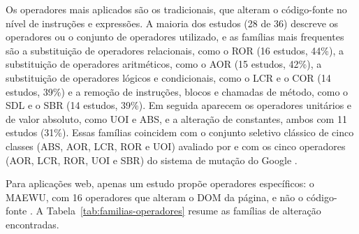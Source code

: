 Os operadores mais aplicados são os tradicionais, que alteram o código-fonte no nível de instruções e expressões. A maioria dos estudos (28 de 36) descreve os operadores ou o conjunto de operadores utilizado, e as famílias mais frequentes são a substituição de operadores relacionais, como o ROR (16 estudos, 44\%), a substituição de operadores aritméticos, como o AOR (15 estudos, 42\%), a substituição de operadores lógicos e condicionais, como o LCR e o COR (14 estudos, 39\%) e a remoção de instruções, blocos e chamadas de método, como o SDL e o SBR (14 estudos, 39\%). Em seguida aparecem os operadores unitários e de valor absoluto, como UOI e ABS, e a alteração de constantes, ambos com 11 estudos (31\%). Essas famílias coincidem com o conjunto seletivo clássico de cinco classes (ABS, AOR, LCR, ROR e UOI) avaliado por  e com os cinco operadores (AOR, LCR, ROR, UOI e SBR) do sistema de mutação do Google \cite{petrovic2021}.

Para aplicações web, apenas um estudo propõe operadores específicos: o MAEWU, com 16 operadores que alteram o DOM da página, e não o código-fonte \cite{yandrapally2021}. A Tabela~\ref{tab:familias-operadores} resume as famílias de alteração encontradas.


